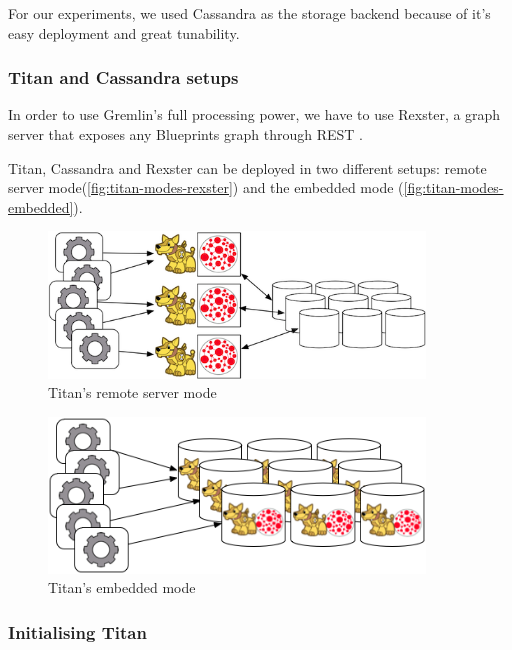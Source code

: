 For our experiments, we used Cassandra as the storage backend because of it's easy deployment and great tunability.

\subsubsection{Titan and Cassandra setups}

In order to use Gremlin's full processing power, we have to use Rexster, a graph server that exposes any Blueprints graph through REST \cite{Rexster}.

Titan, Cassandra and Rexster can be deployed in two different setups: remote server mode(\autoref{fig:titan-modes-rexster}) and the embedded mode (\autoref{fig:titan-modes-embedded}).

\begin{figure}
\begin{center}
\includegraphics[width=10cm]{figures/titan-modes-rexster}
\caption{Titan's remote server mode}
\label{fig:titan-modes-rexster}
\end{center}
\end{figure}

\begin{figure}
\begin{center}
\includegraphics[width=10cm]{figures/titan-modes-embedded}
\caption{Titan's embedded mode}
\label{fig:titan-modes-embedded}
\end{center}
\end{figure}

\subsubsection{Initialising Titan}

